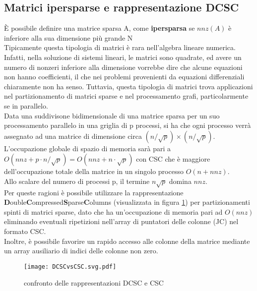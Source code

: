 \subsection{Matrici ipersparse e rappresentazione DCSC}
È possibile definire una matrice sparsa A, come {\bf ipersparsa }se $nnz(A)$ è
inferiore alla sua dimensione più grande N \cite{2dNewIdeas} \\ %
Tipicamente questa tipologia di matrici è rara nell'algebra lineare numerica.
Infatti, nella soluzione di sistemi lineari, le matrici sono quadrate, ed avere un numero di nonzeri inferiore alla dimensione 
vorrebbe dire che alcune equazioni non hanno coefficienti, 
il che nei problemi provenienti da equazioni differenziali chiaramente non ha senso.
Tuttavia, questa tipologia di matrici trova applicazioni nel partizionamento di matrici sparse 
e nel processamento grafi, particolarmente se in parallelo.\\
\voidLine
Data una suddivisone bidimensionale di una matrice sparsa %
per un suo processamento parallelo in una griglia di p processi, si ha che ogni processo
verrà assegnato ad una matrice di dimensione circa $(n/\sqrt{p})\times(n/\sqrt{p})$.\\ %
L'occupazione globale di spazio di memoria sarà pari a 
$O(nnz + p \cdot n/\sqrt{p}) = O(nnz + n \cdot \sqrt{p})$ con CSC che è maggiore
dell'occupazione totale della matrice in un singolo processo $O(n + nnz)$.\\
Allo scalare del numero di processi p, il termine $n\sqrt{p}$ domina $nnz$.\\
\voidLine
Per queste ragioni è possibile utilizzare la rappresentazione \\
{\bf D}ouble{\bf C}ompressed{\bf S}parse{\bf C}olumns (visualizzata in figura \ref{fig:DCSCvsCSC})
per partizionamenti spinti di matrici sparse,
dato che ha un'occupazione di memoria pari ad $O(nnz)$
eliminando eventuali ripetizioni nell'array di puntatori delle colonne (JC) nel formato CSC.\\
Inoltre, è possibile favorire un rapido accesso alle colonne della matrice mediante un
array ausiliario di indici delle colonne non zero.
\begin{figure}[H]
  \centering \texttt{[image: DCSCvsCSC.svg.pdf]} 
  \caption[DCSC vs CSC]{confronto delle rappresentazioni DCSC e CSC}
  \decoRule \label{fig:DCSCvsCSC}
\end{figure}


